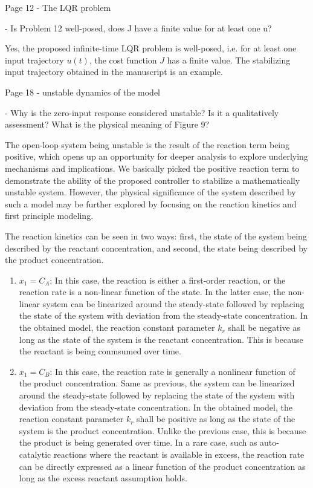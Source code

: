 \documentclass[12pt,answers]{exam}
\begin{document}
\begin{questions}
    \question Page 12 - The LQR problem

    - Is Problem 12 well-posed, does J have a finite value for at least one u?

    \begin{solutionorbox}
        Yes, the proposed infinite-time LQR problem is well-posed, i.e. for at least one input trajectory $u(t)$, the cost function $J$ has a finite value. The stabilizing input trajectory obtained in the manuscript is an example. %
    \end{solutionorbox}


    \question Page 18 - unstable dynamics of the model

    - Why is the zero-input response considered unstable? Is it a qualitatively assessment? What is the physical meaning of Figure 9?

    \begin{solutionorbox}
        The open-loop system being unstable is the result of the reaction term being positive, which opens up an opportunity for deeper analysis to explore underlying mechanisms and implications. We basically picked the positive reaction term to demonstrate the ability of the proposed controller to stabilize a mathematically unstable system. However, the physical significance of the system described by such a model may be further explored by focusing on the reaction kinetics and first principle modeling. 
        
        The reaction kinetics can be seen in two ways: first, the state of the system being described by the reactant concentration, and second, the state being described by the product concentration. 

    \begin{enumerate}
        \item  $x_1 = C_A$: In this case, the reaction is either a first-order reaction, or the reaction rate is a non-linear function of the state. In the latter case, the non-linear system can be linearized around the steady-state followed by replacing the state of the system with deviation from the steady-state concentration. In the obtained model, the reaction constant parameter $k_r$ shall be negative as long as the state of the system is the reactant concentration. This is because the reactant is being conmsumed over time.
        \item $x_1 = C_B$: In this case, the reaction rate is generally a nonlinear function of the product concentration. Same as previous, the system can be linearized around the steady-state followed by replacing the state of the system with deviation from the steady-state concentration. In the obtained model, the reaction constant parameter $k_r$ shall be positive as long as the state of the system is the product concentration. Unlike the previous case, this is because the product is being generated over time. In a rare case, such as auto-catalytic reactions where the reactant is available in excess, the reaction rate can be directly expressed as a linear function of the product concentration as long as the excess reactant assumption holds.
    \end{enumerate}
    

\end{solutionorbox}
\end{questions}
\end{document}
